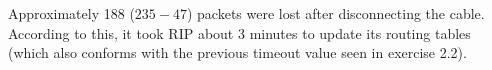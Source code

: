 

Approximately 188 ($235-47$) packets were lost after disconnecting the cable. According to this, it took RIP about 3 minutes to update its routing tables (which also conforms with the previous timeout value seen in exercise 2.2).
